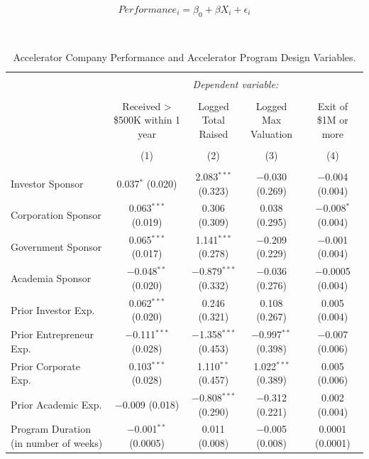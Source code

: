 \documentclass[
  12pt,
]{article}
\begin{document}
\[ Performance_i = \beta_0 + \beta  X_i + \epsilon_i \]

~

\onehalfspacing

\begin{table}[H] \centering 
  \caption{Accelerator Company Performance and Accelerator Program Design Variables.} 
  \label{tab:acccompanyperformanceaccdesign} 
\scriptsize 
\begin{tabular}{@{\extracolsep{1pt}}lcccc} 
\\[-1.8ex]\hline 
\hline \\[-1.8ex] 
 & \multicolumn{4}{c}{\textit{Dependent variable:}} \\ 
\cline{2-5} 
\\[-1.8ex] & \shortstack{Received > \$500K \\ within 1 year} & \shortstack{Logged \\ Total Raised} & \shortstack{Logged \\ Max Valuation} & \shortstack{Exit of \$1M \\ or more} \\ 
\\[-1.8ex] & (1) & (2) & (3) & (4)\\ 
\hline \\[-1.8ex] 
 Investor Sponsor & 0.037$^{*}$ (0.020) & 2.083$^{***}$ (0.323) & $-$0.030 (0.269) & $-$0.004 (0.004) \\ 
  Corporation Sponsor & 0.063$^{***}$ (0.019) & 0.306 (0.309) & 0.038 (0.295) & $-$0.008$^{*}$ (0.004) \\ 
  Government Sponsor & 0.065$^{***}$ (0.017) & 1.141$^{***}$ (0.278) & $-$0.209 (0.229) & $-$0.001 (0.004) \\ 
  Academia Sponsor & $-$0.048$^{**}$ (0.020) & $-$0.879$^{***}$ (0.332) & $-$0.036 (0.276) & $-$0.0005 (0.004) \\ 
  Prior Investor Exp. & 0.062$^{***}$ (0.020) & 0.246 (0.321) & 0.108 (0.267) & 0.005 (0.004) \\ 
  Prior Entrepreneur Exp. & $-$0.111$^{***}$ (0.028) & $-$1.358$^{***}$ (0.453) & $-$0.997$^{**}$ (0.398) & $-$0.007 (0.006) \\ 
  Prior Corporate Exp. & 0.103$^{***}$ (0.028) & 1.110$^{**}$ (0.457) & 1.022$^{***}$ (0.389) & 0.005 (0.006) \\ 
  Prior Academic Exp. & $-$0.009 (0.018) & $-$0.808$^{***}$ (0.290) & $-$0.312 (0.221) & 0.002 (0.004) \\ 
  Program Duration (in number of weeks) & $-$0.001$^{**}$ (0.0005) & 0.011 (0.008) & $-$0.005 (0.008) & 0.0001 (0.0001) \\ 

\end{tabular}
\end{table}
\end{document}
